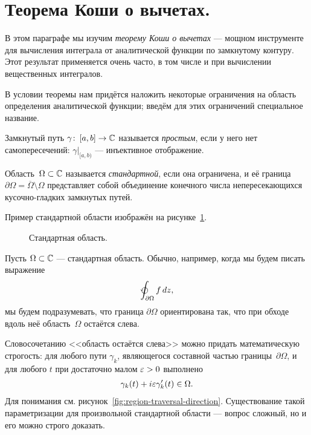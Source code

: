 \documentclass[../complex-analysis.tex]{subfiles}
\begin{document}
\newpage
\section{Теорема Коши о вычетах.}

В этом параграфе мы изучим \emph{теорему Коши о вычетах} --- мощном инструменте для вычисления интеграла от аналитической функции по замкнутому контуру. Этот результат применяется очень часто, в том числе и при вычислении вещественных интегралов.

В условии теоремы нам придётся наложить некоторые ограничения на область определения аналитической функции; введём для этих ограничений специальное название.

\begin{df}
 Замкнутый путь $ \gamma\colon\,[a,b] \to \mathbb{C} $ называется \textit{простым}, если у него нет самопересечений: $\gamma |_{[a,b)}$ --- инъективное отображение.
\end{df}

\begin{df}
 Область~$ \Omega \subset \mathbb{C} $ называется \emph{стандартной}, если она ограничена, и её граница $ \partial\Omega = \overline \Omega \setminus \Omega $ представляет собой объединение конечного числа непересекающихся кусочно-гладких замкнутых путей.
\end{df}

Пример стандартной области изображён на рисунке~\ref{fig:standart-region}.

\begin{figure}[ht]
 \centering
 \caption{Стандартная область.}
 \label{fig:standart-region}
\end{figure}

\begin{conventn}
 Пусть $ \Omega \subset\mathbb{C}$ --- стандартная область. Обычно, например, когда мы будем писать выражение
 \begin{align*}
  \varointctrclockwise_{\partial \Omega} f \, dz,
 \end{align*} мы будем подразумевать, что граница $ \partial \Omega $ ориентирована так, что при обходе вдоль неё область~$ \Omega $ остаётся слева.

 Словосочетанию <<область остаётся слева>> можно придать математическую строгость: для любого пути $ \gamma_k $, являющегося составной частью границы~$ \partial\Omega $, и для любого $ t $ при достаточно малом $ \varepsilon > 0 $ выполнено
 \begin{align*}
  \gamma_k(t) + i\varepsilon\gamma_k'(t) \in \Omega.
 \end{align*} Для понимания см. рисунок~\ref{fig:region-traversal-direction}. Существование такой параметризации для произвольной стандартной области --- вопрос сложный, но и его можно строго доказать.
\end{conventn}
\end{document}
